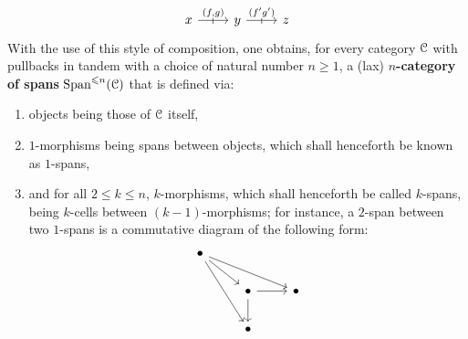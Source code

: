 \begin{definition}[Spans]
\begin{enumerate}
                            $$
                                \begin{tikzcd}
                                	x & y & z
                                	\arrow["{(f,g)}", "\shortmid"{marking}, from=1-1, to=1-2]
                                	\arrow["{(f' g')}", "\shortmid"{marking}, from=1-2, to=1-3]
                                \end{tikzcd}
                            $$
                        With the use of this style of composition, one obtains, for every category $\mathcal{C}$ with pullbacks in tandem with a choice of natural number $n \geq 1$, a (lax) \textbf{$n$-category of spans} $\mathrm{Span}^{\leqslant n}(\mathcal{C})$ that is defined via:
                            \begin{enumerate}
                                \item objects being those of $\mathcal{C}$ itself,
                                \item $1$-morphisms being spans between objects, which shall henceforth be known as $1$-spans,
                                \item and for all $2 \leq k \leq n$, $k$-morphisms, which shall henceforth be called $k$-spans, being $k$-cells between $(k-1)$-morphisms; for instance, a $2$-span between two $1$-spans is a commutative diagram of the following form:
                                    $$
                                        \begin{tikzcd}
                                        	\bullet \\
                                        	& \bullet & \bullet \\
                                        	& \bullet
                                        	\arrow[from=1-1, to=2-2]
                                        	\arrow[from=1-1, to=3-2]
                                        	\arrow[from=2-2, to=3-2]
                                        	\arrow[from=2-2, to=2-3]
                                        	\arrow[from=1-1, to=2-3]
                                        \end{tikzcd}
                                    $$
                            \end{enumerate}
                    \end{enumerate}
                \end{definition}
